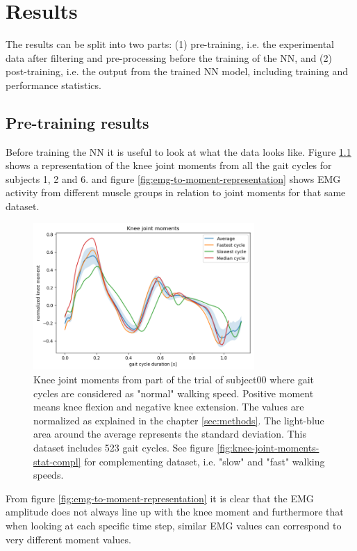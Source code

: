 \documentclass[../main.tex]{subfiles}
\begin{document}
\chapter{Results}
The results can be split into two parts: (1) pre-training, i.e. the experimental data after filtering and pre-processing before the training of the \ac{NN}, and (2) post-training, i.e. the output from the trained \ac{NN} model, including training and performance statistics.

\section{Pre-training results}
Before training the \ac{NN} it is useful to look at what the data looks like.
Figure \ref{fig:knee-joint-moments-stat} shows a representation of the knee joint moments from all the gait cycles for subjects 1, 2 and 6.  and figure \ref{fig:emg-to-moment-representation} shows \ac{EMG} activity from different muscle groups in relation to joint moments for that same dataset.
\begin{figure}
    \centering
    \includegraphics[width=0.75\textwidth]{img/results/20190429_06_moments_normal_walk.png}
    \caption{Knee joint moments from part of the trial of subject00 where gait cycles are considered as "normal" walking speed. Positive moment means knee flexion and negative knee extension. The values are normalized as explained in the chapter \ref{sec:methods}. The light-blue area around the average represents the standard deviation. This dataset includes 523 gait cycles. See figure \ref{fig:knee-joint-moments-stat-compl} for complementing dataset, i.e. "slow" and "fast" walking speeds. }
    \label{fig:knee-joint-moments-stat}
\end{figure}
From figure \ref{fig:emg-to-moment-representation} it is clear that the \ac{EMG} amplitude does not always line up with the knee moment and furthermore that when looking at each specific time step, similar \ac{EMG} values can correspond to very different moment values. 
\end{document}
